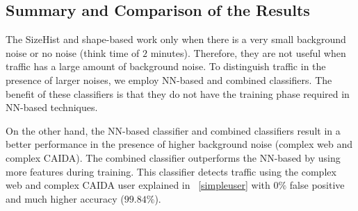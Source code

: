 \begin{comment}
\begin{table}
\center \caption{Result of combined classifier.}\label{tab:comb}
\begin{tabular}{|c|c|c|c|}
\hline
 Training size& False positive ($\%$) &True positive ($\%$)&Accuracy ($\%$)\\
      \hline
	$5000$    &$0.28$   & $99.73$   & $99.72$\\%
	$10,000$  &$0.05$   & $99.73$   & $99.84$\\%
	$20,000$  &$0.085$  & $99.76$   & $99.84$\\%
	$40,000$  &$0.0$    & $99.74$   & $99.84$\\%
\hline
\end{tabular}
\end{table}
\end{comment}
\subsection{Summary and Comparison of the Results}

The SizeHist and shape-based work only when there is a very small background noise or no noise (think time of $2$ minutes). Therefore, they are not useful when \bc traffic has a large amount of background noise. To distinguish \bc traffic in the presence of larger noises, we employ NN-based and combined classifiers. The benefit of these classifiers is that they do not have the training phase required in NN-based techniques.

On the other hand, the NN-based classifier and combined classifiers result in a better performance in the presence of higher background noise (complex web and complex CAIDA). The combined classifier outperforms the NN-based by using more features during training. This classifier detects \bc traffic using the complex web and complex CAIDA user explained in ~\ref{simpleuser} with $0\%$ false positive and much higher accuracy ($99.84\%$).



